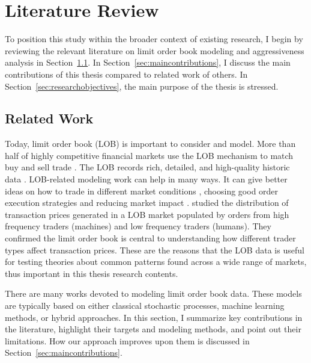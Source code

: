\chapter{Literature Review} \label{chapter:literature}
To position this study within the broader context of existing research, I begin by reviewing the relevant literature on limit order book modeling and aggressiveness analysis in Section~\ref{sec:relatedwork}. In Section~\ref{sec:maincontributions}, I discuss the main contributions of this thesis compared to related work of others. In Section~\ref{sec:researchobjectives}, the main purpose of the thesis is stressed.                                                                                  
\section{Related Work} \label{sec:relatedwork}
Today, limit order book (LOB) is important to consider and model. More than half of highly competitive financial markets use the LOB mechanism to match buy and sell trade \citep{lob2009}. The LOB records rich, detailed, and high-quality historic data \citep{gould_limit_2013}. LOB-related modeling work can help in many ways. It can give better ideas on how to trade in different market conditions \citep{SuperDOT1996}, choosing good order execution strategies \citep{OBIZHAEVA20131} and reducing market impact \citep{Eisler01092012}. \cite{cvitanic_high_nodate} studied the distribution of transaction prices generated in a LOB market populated by orders from high frequency traders (machines) and low frequency traders (humans). They confirmed the limit order book is central to understanding how different trader types affect transaction prices. These are the reasons that the LOB data is useful for testing theories about common patterns found across a wide range of markets, thus important in this thesis research contents. 

There are many works devoted to modeling limit order book data. These models are typically based on either classical stochastic processes, machine learning methods, or hybrid approaches. In this section, I summarize key contributions in the literature, highlight their targets and modeling methods, and point out their limitations. How our approach improves upon them is discussed in Section~\ref{sec:maincontributions}.

